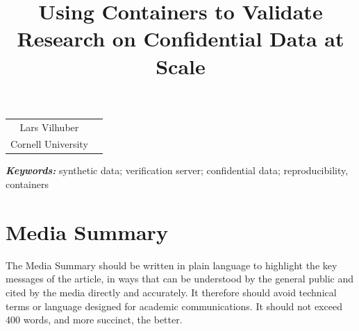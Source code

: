 \documentclass[inline]{hdsr}
\begin{document}




\begin{center}

  \title{Using Containers to Validate Research on Confidential Data at Scale}
  \maketitle

  \thispagestyle{empty}
  
  \vspace*{.2in}

  \begin{tabular}{cc}
    Lars Vilhuber\upstairs{\affilone,*}
   \\[0.25ex]
   {\small \upstairs{\affilone} Cornell University} \\
  \end{tabular}
  
  \vspace*{0.4in}

\begin{abstract}

\end{abstract}
\end{center}

\vspace*{0.15in}
\hspace{10pt}
  \small	
  \textbf{\textit{Keywords: }} {synthetic data; verification server; confidential data; reproducibility, containers}
  
\copyrightnotice

\section*{Media Summary}
The Media Summary should be written in plain language to highlight the key messages of
the article, in ways that can be understood by the general public and cited by the media 
directly and accurately.  It therefore should avoid technical terms or language designed for
academic communications. It should not exceed 400 words, and more succinct, the better.
\end{document}
